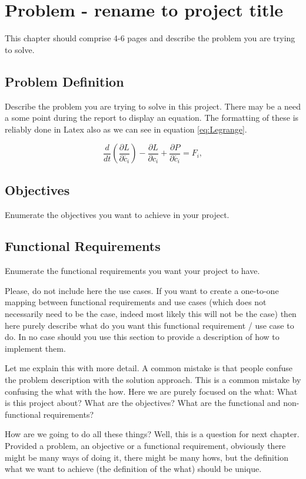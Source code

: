 \chapter{Problem - rename to project title}
This chapter should comprise 4-6 pages and describe the problem you are trying to solve.

\section{Problem Definition}
Describe the problem you are trying to solve in this project. There may be a need a some point during the report to display an equation. The formatting of these is reliably done in Latex also as we can see in equation \ref{eq:Legrange}.

\begin{equation}
\frac{d}{dt}(\frac{\partial L}{\partial \dot{c_i}})-\frac{\partial L}{\partial c_i}+\frac{\partial P}{\partial \dot{c_i}} = F_i,
\label{eq:Legrange}
\end{equation}


\section{Objectives}
Enumerate the objectives you want to achieve in your project.

\section{Functional Requirements}
Enumerate the functional requirements you want your project to have. 

Please, do not include here the use cases. If you want to create a one-to-one mapping between functional requirements and use cases (which does not necessarily need to be the case, indeed most likely this will not be the case) then here purely describe what do you want this functional requirement / use case to do. In no case should you use this section to provide a description of how to implement them.  

Let me explain this with more detail. A common mistake is that people confuse the problem description with the solution approach. This is a common mistake by confusing the what with the how. Here we are purely focused on the what: What is this project about? What are the objectives? What are the functional and non-functional requirements? 

How are we going to do all these things? Well, this is a question for next chapter. Provided a problem, an objective or a functional requirement, obviously there might be many ways of doing it, there might be many hows, but the definition what we want to achieve (the definition of the what) should be unique.

